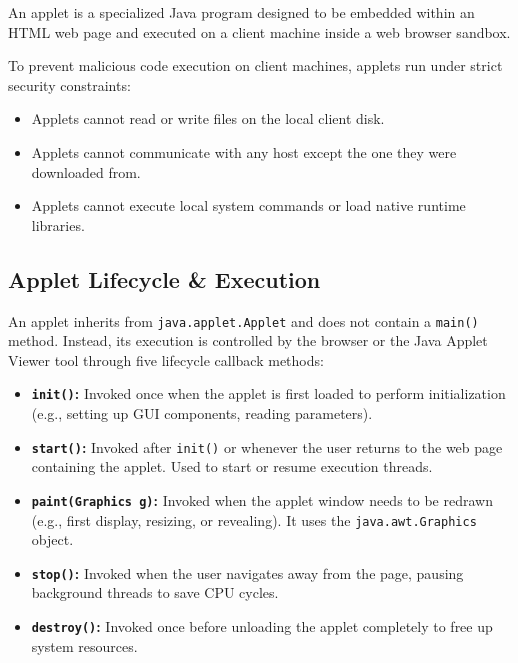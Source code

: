 \documentclass[12pt,a4paper]{article}
\begin{document}
An applet is a specialized Java program designed to be embedded within an HTML web page and executed on a client machine inside a web browser sandbox.

\begin{tcolorbox}[defbox, title={\textbf{Applet Security Sandbox}}]
To prevent malicious code execution on client machines, applets run under strict security constraints:
\begin{itemize}[leftmargin=*, itemsep=3pt]
  \item Applets cannot read or write files on the local client disk.
  \item Applets cannot communicate with any host except the one they were downloaded from.
  \item Applets cannot execute local system commands or load native runtime libraries.
\end{itemize}
\end{tcolorbox}

\subsection{Applet Lifecycle \& Execution}
An applet inherits from \texttt{java.applet.Applet} and does not contain a \texttt{main()} method. Instead, its execution is controlled by the browser or the Java Applet Viewer tool through five lifecycle callback methods:
\begin{itemize}[leftmargin=*, itemsep=4pt]
  \item \textbf{\texttt{init()}:} Invoked once when the applet is first loaded to perform initialization (e.g., setting up GUI components, reading parameters).
  \item \textbf{\texttt{start()}:} Invoked after \texttt{init()} or whenever the user returns to the web page containing the applet. Used to start or resume execution threads.
  \item \textbf{\texttt{paint(Graphics g)}:} Invoked when the applet window needs to be redrawn (e.g., first display, resizing, or revealing). It uses the \texttt{java.awt.Graphics} object.
  \item \textbf{\texttt{stop()}:} Invoked when the user navigates away from the page, pausing background threads to save CPU cycles.
  \item \textbf{\texttt{destroy()}:} Invoked once before unloading the applet completely to free up system resources.
\end{itemize}
\end{document}
